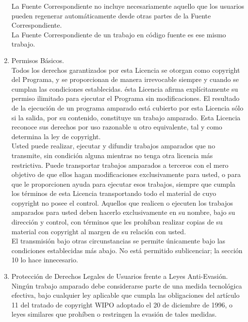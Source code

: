 \begin{enumerate}
	La Fuente Correspondiente no incluye necesariamente aquello que los usuarios pueden regenerar automáticamente desde otras partes de la Fuente Correspondiente.\\
	
	La Fuente Correspondiente de un trabajo en código fuente es ese mismo trabajo.\\
	
	\item Permisos Básicos.\\
	
	Todos los derechos garantizados por esta Licencia se otorgan como copyright del Programa, y se proporcionan de manera irrevocable siempre y cuando se cumplan las condiciones establecidas. ésta Licencia afirma explícitamente su permiso ilimitado para ejecutar el Programa sin modificaciones. El resultado de la ejecución de un programa amparado está cubierto por esta Licencia sólo si la salida, por su contenido, constituye un trabajo amparado. Esta Licencia reconoce sus derechos por uso razonable u otro equivalente, tal y como determina la ley de copyright.\\
	
	Usted puede realizar, ejecutar y difundir trabajos amparados que no transmite, sin condición alguna mientras no tenga otra licencia más restrictiva. Puede transportar trabajos amparados a terceros con el mero objetivo de que ellos hagan modificaciones exclusivamente para usted, o para que le proporcionen ayuda para ejecutar esos trabajos, siempre que cumpla los términos de esta Licencia transportando todo el material de cuyo copyright no posee el control. Aquellos que realicen o ejecuten los trabajos amparados para usted deben hacerlo exclusivamente en su nombre, bajo su dirección y control, con términos que les prohíban realizar copias de su material con copyright al margen de su relación con usted.\\
	
	El transmisión bajo otras circunstancias se permite únicamente bajo las condiciones establecidas más abajo. No está permitido sublicenciar; la sección 10 lo hace innecesario.\\
	
	\item Protección de Derechos Legales de Usuarios frente a Leyes Anti-Evasión.\\
	
	Ningún trabajo amparado debe considerarse parte de una medida tecnológica efectiva, bajo cualquier ley aplicable que cumpla las obligaciones del artículo 11 del tratado de copyright WIPO adoptado el 20 de diciembre de 1996, o leyes similares que prohíben o restringen la evasión de tales medidas.\\
	

\end{enumerate}
